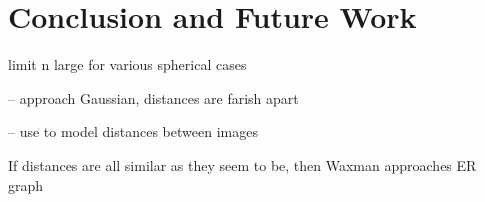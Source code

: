 \documentclass{article}
\begin{document}
\clearpage


\clearpage


 
\clearpage
\section{Conclusion and Future Work}


limit n large for various spherical cases

  -- approach Gaussian, distances are farish apart

  -- use to model distances between images

If distances are all similar as they seem to be, then Waxman
approaches ER graph 

\appendix 

\clearpage



\setlength{\parskip}{1mm}

% 

\end{document}

